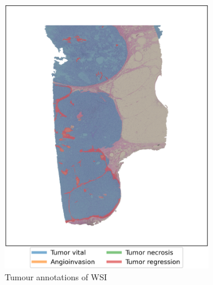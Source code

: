 \begin{figure}[h!t]
    \centering
     \begin{subfigure}[b]{0.475\textwidth}
         \centering
         \includegraphics[width=\textwidth]{latex/captum/case111/masks_case111-stain1-censored_3499days.png}
         \caption{Tumour annotations of WSI}
     \end{subfigure}
    \hfill
     \begin{subfigure}[b]{0.49\textwidth}
         \centering

\end{subfigure}
\end{figure}
